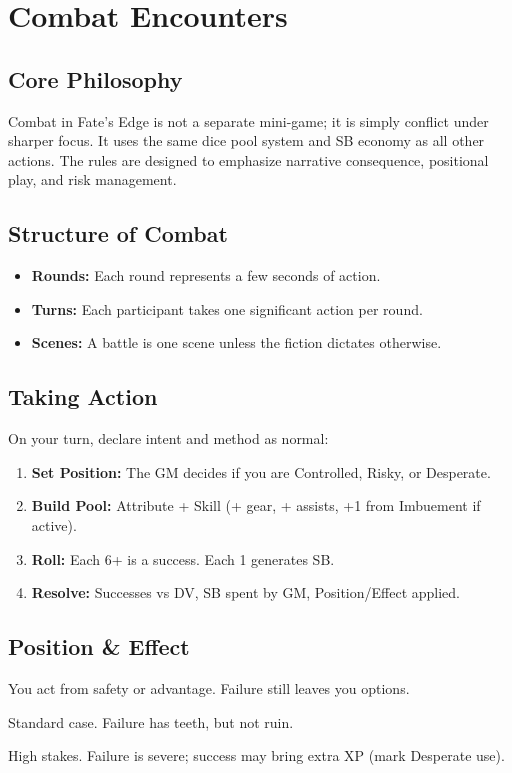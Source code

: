 

\section{Combat Encounters}

\subsection{Core Philosophy}
Combat in Fate's Edge is not a separate mini-game; it is simply conflict under sharper focus. 
It uses the same dice pool system and SB economy as all other actions. 
The rules are designed to emphasize narrative consequence, positional play, and risk management.

\subsection{Structure of Combat}
\begin{itemize}
  \item \textbf{Rounds:} Each round represents a few seconds of action.
  \item \textbf{Turns:} Each participant takes one significant action per round.
  \item \textbf{Scenes:} A battle is one scene unless the fiction dictates otherwise.
\end{itemize}

\subsection{Taking Action}
On your turn, declare intent and method as normal:
\begin{enumerate}
  \item \textbf{Set Position:} The GM decides if you are Controlled, Risky, or Desperate.
  \item \textbf{Build Pool:} Attribute + Skill (+ gear, + assists, +1 from Imbuement if active).
  \item \textbf{Roll:} Each 6+ is a success. Each 1 generates SB.
  \item \textbf{Resolve:} Successes vs DV, SB spent by GM, Position/Effect applied.
\end{enumerate}

\subsection{Position \& Effect}
\begin{description}[leftmargin=1.5em]
  \item[Controlled] You act from safety or advantage. Failure still leaves you options.
  \item[Risky] Standard case. Failure has teeth, but not ruin.
  \item[Desperate] High stakes. Failure is severe; success may bring extra XP (mark Desperate use).
\end{description}
